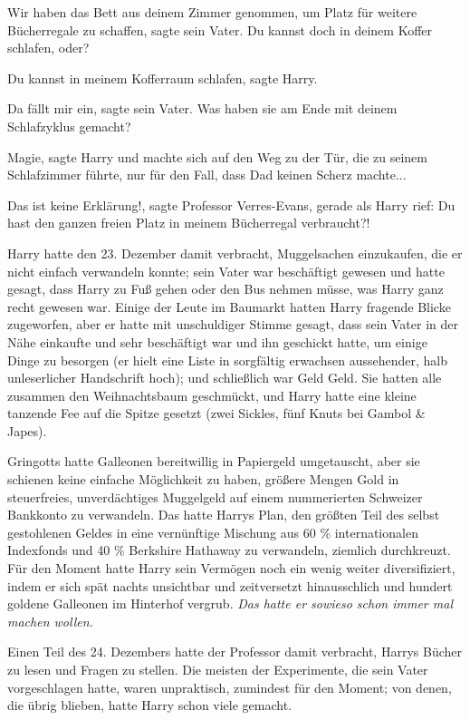 \glqq{}Wir haben das Bett aus deinem Zimmer genommen, um Platz für weitere
Bücherregale zu schaffen\grqq{}, sagte sein Vater. \glqq{}Du kannst doch in
deinem Koffer schlafen, oder?\grqq{}

\glqq{}Du kannst in meinem Kofferraum schlafen\grqq{}, sagte Harry.

\glqq{}Da fällt mir ein\grqq{}, sagte sein Vater. \glqq{}Was haben sie am Ende mit
deinem Schlafzyklus gemacht?\grqq{}

\glqq{}Magie\grqq{}, sagte Harry und machte sich auf den Weg zu der Tür, die zu
seinem Schlafzimmer führte, nur für den Fall, dass Dad keinen Scherz machte...

\glqq{}Das ist keine Erklärung!\grqq{}, sagte Professor Verres-Evans, gerade als
Harry rief: \glqq{}Du hast den ganzen freien Platz in meinem Bücherregal
verbraucht?!\grqq{}

Harry hatte den 23. Dezember damit verbracht, Muggelsachen einzukaufen, die er
nicht einfach verwandeln konnte; sein Vater war beschäftigt gewesen und hatte
gesagt, dass Harry zu Fuß gehen oder den Bus nehmen müsse, was Harry ganz recht
gewesen war. Einige der Leute im Baumarkt hatten Harry fragende Blicke
zugeworfen, aber er hatte mit unschuldiger Stimme gesagt, dass sein Vater in der
Nähe einkaufte und sehr beschäftigt war und ihn geschickt hatte, um einige Dinge
zu besorgen (er hielt eine Liste in sorgfältig erwachsen aussehender, halb
unleserlicher Handschrift hoch); und schließlich war Geld Geld. Sie hatten alle
zusammen den Weihnachtsbaum geschmückt, und Harry hatte eine kleine tanzende Fee
auf die Spitze gesetzt (zwei Sickles, fünf Knuts bei Gambol \& Japes).

Gringotts hatte Galleonen bereitwillig in Papiergeld umgetauscht, aber sie
schienen keine einfache Möglichkeit zu haben, größere Mengen Gold in
steuerfreies, unverdächtiges Muggelgeld auf einem nummerierten Schweizer
Bankkonto zu verwandeln. Das hatte Harrys Plan, den größten Teil des selbst
gestohlenen Geldes in eine vernünftige Mischung aus 60 \% internationalen
Indexfonds und 40 \% Berkshire Hathaway zu verwandeln, ziemlich durchkreuzt. Für
den Moment hatte Harry sein Vermögen noch ein wenig weiter diversifiziert, indem
er sich spät nachts unsichtbar und zeitversetzt hinausschlich und hundert
goldene Galleonen im Hinterhof vergrub.
\emph{Das hatte er sowieso schon immer mal machen wollen.}

Einen Teil des 24. Dezembers hatte der Professor damit verbracht, Harrys Bücher
zu lesen und Fragen zu stellen. Die meisten der Experimente, die sein Vater
vorgeschlagen hatte, waren unpraktisch, zumindest für den Moment; von denen, die
übrig blieben, hatte Harry schon viele gemacht.

